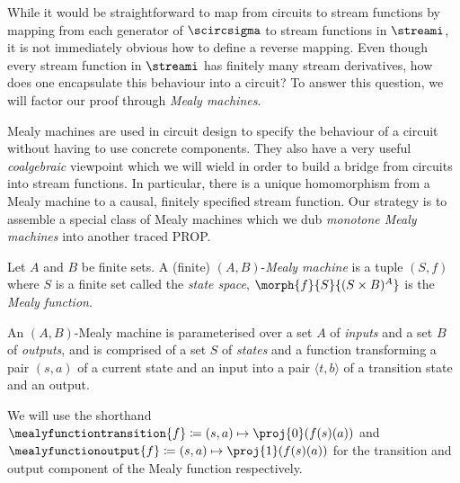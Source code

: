 \documentclass{lmcs}
\begin{document}
While it would be straightforward to map from circuits to stream functions by
mapping from each generator of \(\scircsigma\) to stream functions in
\(\streami\), it is not immediately obvious how to define a reverse mapping.
Even though every stream function in \(\streami\) has finitely many stream
derivatives, how does one encapsulate this behaviour into a circuit?
To answer this question, we will factor our proof through
\emph{Mealy machines}.

Mealy machines are used in circuit design to specify the behaviour of a circuit
without having to use concrete components.
They also have a very useful \emph{coalgebraic} viewpoint which we will wield in
order to build a bridge from circuits into stream functions.
In particular, there is a unique homomorphism from a Mealy machine to a causal,
finitely specified stream function.
Our strategy is to assemble a special class of Mealy machines which we dub
\emph{monotone Mealy machines} into another traced PROP.

\begin{defi}\label{def:mealy}
    Let \(A\) and \(B\) be finite sets.
    A (finite) \((A,B)\)-\emph{Mealy machine} is a tuple \((S, f)\) where
    \(S\) is a finite set called the \emph{state space},
    \(\morph{f}{S}{(S \times B)^A}\) is the \emph{Mealy function}.
\end{defi}

An \((A,B)\)-Mealy machine is parameterised over a set \(A\) of \emph{inputs}
and a set \(B\) of \emph{outputs}, and is comprised of a set \(S\) of
\emph{states} and a function transforming a pair \((s, a)\) of a current state
and an input into a pair \(\langle{t,b}\rangle\) of a transition state and an
output.

\begin{nota}
    We will use the shorthand \(
    \mealyfunctiontransition{f} \coloneqq (s, a) \mapsto \proj{0}(f(s)(a))
    \) and \(
    \mealyfunctionoutput{f} \coloneqq (s, a) \mapsto \proj{1}(f(s)(a))
    \) for the transition and output component of the Mealy function respectively.
\end{nota}
\end{document}
